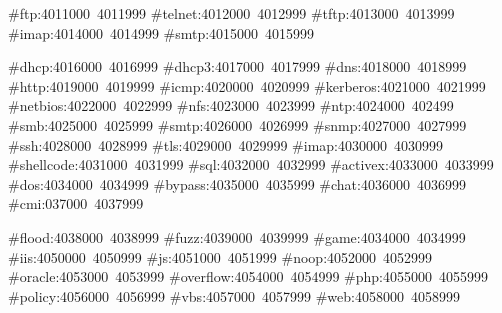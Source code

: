 #ftp:4011000~4011999
#telnet:4012000~4012999
#tftp:4013000~4013999
#imap:4014000~4014999
#smtp:4015000~4015999

#dhcp:4016000~4016999
#dhcp3:4017000~4017999
#dns:4018000~4018999
#http:4019000~4019999
#icmp:4020000~4020999
#kerberos:4021000~4021999
#netbios:4022000~4022999
#nfs:4023000~4023999
#ntp:4024000~402499
#smb:4025000~4025999
#smtp:4026000~4026999
#snmp:4027000~4027999
#ssh:4028000~4028999
#tls:4029000~4029999
#imap:4030000~4030999
#shellcode:4031000~4031999
#sql:4032000~4032999
#activex:4033000~4033999
#dos:4034000~4034999
#bypass:4035000~4035999
#chat:4036000~4036999
#cmi:037000~4037999

#flood:4038000~4038999
#fuzz:4039000~4039999
#game:4034000~4034999
#iis:4050000~4050999
#js:4051000~4051999
#noop:4052000~4052999
#oracle:4053000~4053999
#overflow:4054000~4054999
#php:4055000~4055999
#policy:4056000~4056999
#vbs:4057000~4057999
#web:4058000~4058999

